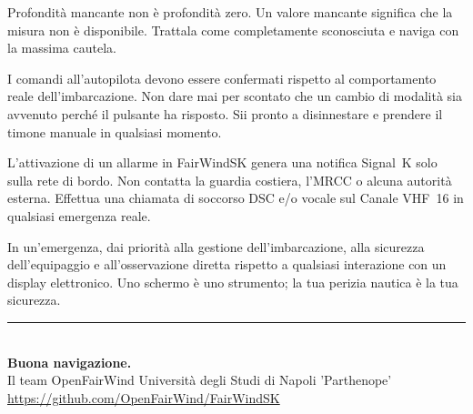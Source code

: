 \begin{warningbox}
Profondità mancante non è profondità zero.
Un valore mancante significa che la misura non è disponibile.
Trattala come completamente sconosciuta e naviga con la massima cautela.
\end{warningbox}

\begin{warningbox}
I comandi all'autopilota devono essere confermati rispetto al comportamento reale
dell'imbarcazione.
Non dare mai per scontato che un cambio di modalità sia avvenuto perché il pulsante
ha risposto.
Sii pronto a disinnestare e prendere il timone manuale in qualsiasi momento.
\end{warningbox}

\begin{warningbox}
L'attivazione di un allarme in FairWindSK genera una notifica Signal~K solo sulla rete
di bordo.
Non contatta la guardia costiera, l'MRCC o alcuna autorità esterna.
Effettua una chiamata di soccorso DSC e/o vocale sul Canale VHF~16 in qualsiasi
emergenza reale.
\end{warningbox}

\begin{warningbox}
In un'emergenza, dai priorità alla gestione dell'imbarcazione, alla sicurezza
dell'equipaggio e all'osservazione diretta rispetto a qualsiasi interazione
con un display elettronico.
Uno schermo è uno strumento; la tua perizia nautica è la tua sicurezza.
\end{warningbox}

\vfill
\begin{center}
  {\color{Teal}\rule{0.5\textwidth}{1pt}}\\[10pt]
  {\Large\sffamily\bfseries\color{Navy}Buona navigazione.}\\[8pt]
  {\normalsize\sffamily\color{gray}
    Il team OpenFairWind \textbullet{}
    Università degli Studi di Napoli 'Parthenope'}\\[4pt]
  {\small\sffamily\color{Teal}\url{https://github.com/OpenFairWind/FairWindSK}}
\end{center}
